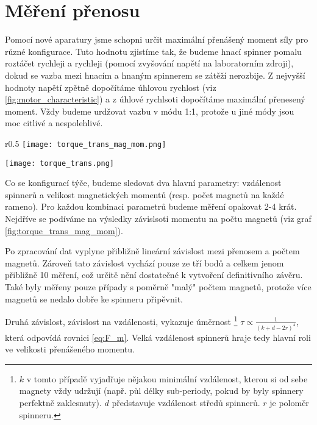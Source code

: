 \clearpage

\section{Měření přenosu}

Pomocí nové aparatury jsme schopni určit maximální přenášený moment síly pro různé konfigurace. Tuto hodnotu zjistíme tak, že budeme hnací spinner pomalu roztáčet rychleji a rychleji (pomocí zvyšování napětí na laboratorním zdroji), dokud se vazba mezi hnacím a hnaným spinnerem se zátěží nerozbije. Z nejvyšší hodnoty napětí zpětně dopočítáme úhlovou rychlost (viz \autoref{fig:motor_characteristic}) a z úhlové rychlsoti dopočítáme maximální přenesený moment. Vždy budeme urdžovat vazbu v módu 1:1, protože u jiné módy jsou moc citlivé a nespolehlivé.

\begin{wrapfigure}{r}{0.5\textwidth}
    \vspace{-1cm}
    \texttt{[image: torque\_trans\_mag\_mom.png]}
    \centering
    \caption{}
    \label{fig:torque_trans_mag_mom}

    \vspace{3cm}
    \texttt{[image: torque\_trans.png]}
    \centering
    \caption{}
    \label{fig:torque_trans}
\end{wrapfigure}

Co se konfigurací týče, budeme sledovat dva hlavní parametry: vzdálenost spinnerů a velikost magnetických momentů (resp. počet magnetů na každé rameno). Pro každou kombinaci parametrů budeme měření opakovat 2-4 krát. Nejdříve se podíváme na výsledky závislsoti momentu na počtu magnetů (viz graf \ref{fig:torque_trans_mag_mom}).

Po zpracování dat vyplyne přibližně lineární závislost mezi přenosem a počtem magnetů. Zároveň tato závislost vychází pouze ze tří bodů a celkem jenom přibližně 10 měření, což určitě nění dostatečné k vytvoření definitivního závěru. Také byly měřeny pouze případy s poměrně "malý" počtem magnetů, protože více magnetů se nedalo dobře ke spinneru připěvnit.

Druhá závislost, závislost na vzdálenosti, vykazuje úměrnost \footnote{$k$ v tomto případě vyjadřuje nějakou minimální vzdálenost, kterou si od sebe magnety vždy udržují (např. půl délky sub-periody, pokud by byly spinnery perfektně zaklesnuty). $d$ představuje vzdálenost středů spinnerů. $r$ je poloměr spinneru. } $\tau \propto \frac{1}{(k+d-2r)^4}$, která odpovídá rovnici \ref{eq:F_m}. Velká vzdálenost spinnerů hraje tedy hlavní roli ve velikosti přenášeného momentu.

\clearpage